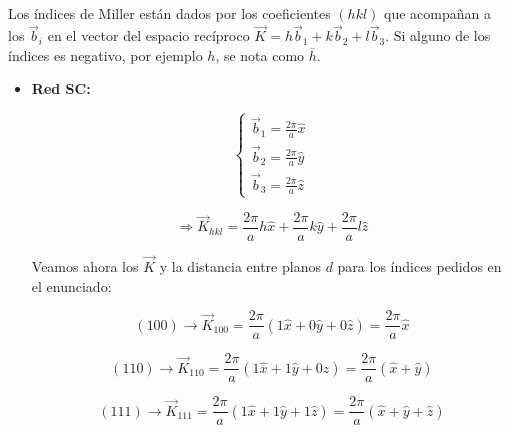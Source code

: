 \documentclass[a4paper]{article}
\begin{document}
\subsection{}

Los \'indices de Miller est\'an dados por los coeficientes $(hkl)$ que acompa\~nan a los $\vec{b}_{i}$ en el vector del espacio rec\'iproco $\vec{K} = h\vec{b}_{1} + k\vec{b}_{2} + l\vec{b}_{3}$. Si alguno de los \'indices es negativo, por ejemplo $h$, se nota como $\overline{h}$.

\begin{itemize}
\item \textbf{Red SC:}

$$\begin{cases}
\vec{b}_{1} = \frac{2 \pi}{a}\hat{x}\\
\vec{b}_{2} = \frac{2 \pi}{a}\hat{y} \\
\vec{b}_{3} = \frac{2 \pi}{a}\hat{z}
\end{cases}$$

$$\Rightarrow \vec{K}_{hkl} = \frac{2 \pi}{a}h\hat{x} + \frac{2 \pi}{a}k\hat{y} + \frac{2 \pi}{a}l\hat{z}$$

Veamos ahora los $\vec{K}$ y la distancia entre planos $d$ para los \'indices pedidos en el enunciado:

$$(100) \rightarrow \vec{K}_{100} = \frac{2 \pi}{a}(1\hat{x} + 0\hat{y} + 0\hat{z}) = \frac{2 \pi}{a}\hat{x}$$

$$(110) \rightarrow \vec{K}_{110} = \frac{2 \pi}{a}(1\hat{x} + 1\hat{y} + 0\hat{z}) = \frac{2 \pi}{a}(\hat{x} + \hat{y})$$

$$(111) \rightarrow \vec{K}_{111} = \frac{2 \pi}{a}(1\hat{x} + 1\hat{y} + 1\hat{z}) = \frac{2 \pi}{a}(\hat{x} + \hat{y} + \hat{z})$$


\end{itemize}
\end{document}
